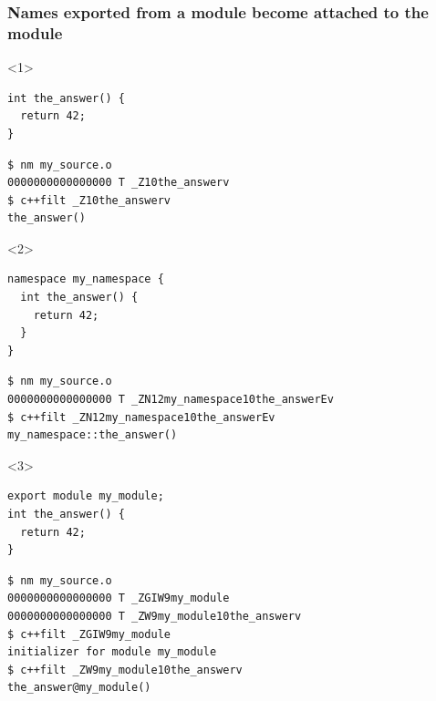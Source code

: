 \documentclass[aspectratio=169]{beamer}
\begin{document}
\begin{frame}[fragile]
  \frametitle{Names exported from a module become attached to the module}

  \begin{onlyenv}<1>
  \begin{lstlisting}[style=cpp20]
int the_answer() {
  return 42;
}
  \end{lstlisting}
  
  \begin{lstlisting}
$ nm my_source.o
0000000000000000 T _Z10the_answerv
$ c++filt _Z10the_answerv
the_answer()
  \end{lstlisting}
  \end{onlyenv}
  
  \begin{onlyenv}<2>
  \begin{lstlisting}[style=cpp20]
namespace my_namespace {
  int the_answer() {
    return 42;
  }
}
  \end{lstlisting}
  
  \begin{lstlisting}
$ nm my_source.o
0000000000000000 T _ZN12my_namespace10the_answerEv
$ c++filt _ZN12my_namespace10the_answerEv
my_namespace::the_answer()
  \end{lstlisting}
  \end{onlyenv}

  \begin{onlyenv}<3>
  \begin{lstlisting}[style=cpp20]
export module my_module;
int the_answer() {
  return 42;
}
  \end{lstlisting}
  
  \begin{lstlisting}[style=none]
$ nm my_source.o
0000000000000000 T _ZGIW9my_module
0000000000000000 T _ZW9my_module10the_answerv
$ c++filt _ZGIW9my_module
initializer for module my_module
$ c++filt _ZW9my_module10the_answerv
the_answer@my_module()
  \end{lstlisting}
  \end{onlyenv}

\end{frame}
\end{document}
